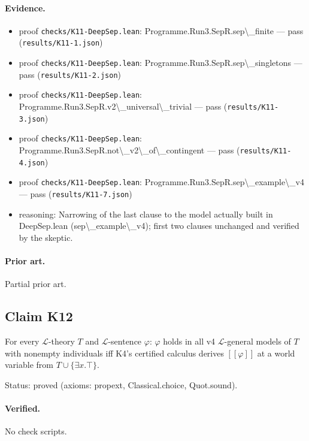\documentclass{article}
\begin{document}
\paragraph{Evidence.}
\begin{itemize}
\item proof \texttt{checks/K11-DeepSep.lean}: Programme.Run3.SepR.sep\textbackslash{}\_finite --- pass (\texttt{results/K11-1.json})
\item proof \texttt{checks/K11-DeepSep.lean}: Programme.Run3.SepR.sep\textbackslash{}\_singletons --- pass (\texttt{results/K11-2.json})
\item proof \texttt{checks/K11-DeepSep.lean}: Programme.Run3.SepR.v2\textbackslash{}\_universal\textbackslash{}\_trivial --- pass (\texttt{results/K11-3.json})
\item proof \texttt{checks/K11-DeepSep.lean}: Programme.Run3.SepR.not\textbackslash{}\_v2\textbackslash{}\_of\textbackslash{}\_contingent --- pass (\texttt{results/K11-4.json})
\item proof \texttt{checks/K11-DeepSep.lean}: Programme.Run3.SepR.sep\textbackslash{}\_example\textbackslash{}\_v4 --- pass (\texttt{results/K11-7.json})
\item reasoning: Narrowing of the last clause to the model actually built in DeepSep.lean (sep\textbackslash{}\_example\textbackslash{}\_v4); first two clauses unchanged and verified by the skeptic.
\end{itemize}

\paragraph{Prior art.} Partial prior art.

\subsection*{Claim K12}

For every $\mathcal L$-theory $T$ and $\mathcal L$-sentence $\varphi$: $\varphi$ holds in all v4 $\mathcal L$-general models of $T$ with nonempty individuals iff K4's certified calculus derives $[\![\varphi]\!]$ at a world variable from $T\cup\{\exists x.\top\}$.

Status: proved (axioms: propext, Classical.choice, Quot.sound).

\paragraph{Verified.}
No check scripts.
\end{document}
